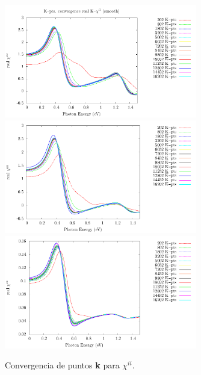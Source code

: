 \documentclass[11pt]{article}
\begin{document}
\begin{figure}
	\begin{center}
		\includegraphics[width=0.75\textwidth]{./figures/up/res1_chi_1_sm.pdf}\\
		\includegraphics[width=0.75\textwidth]{./figures/up/res1_chi_2_sm.pdf}\\
		\includegraphics[width=0.75\textwidth]{./figures/up/res1_chi_3_sm.pdf}
	\end{center}
	\caption{Convergencia de puntos \textbf{k} para $\chi^{ii}$.}
	\label{fig:chi_up}
\end{figure}
\end{document}
